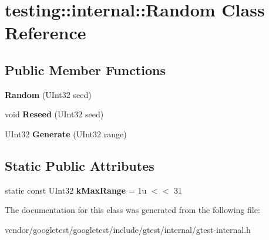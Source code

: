 \hypertarget{classtesting_1_1internal_1_1Random}{}\section{testing\+:\+:internal\+:\+:Random Class Reference}
\label{classtesting_1_1internal_1_1Random}
\subsection*{Public Member Functions}
\begin{DoxyCompactItemize}
\item 
{\bfseries Random} (U\+Int32 seed)\hypertarget{classtesting_1_1internal_1_1Random_a6e112be5e7cce00551f6383025f69460}{}\label{classtesting_1_1internal_1_1Random_a6e112be5e7cce00551f6383025f69460}

\item 
void {\bfseries Reseed} (U\+Int32 seed)\hypertarget{classtesting_1_1internal_1_1Random_adf2f24199318a46f885c78f50d89a69e}{}\label{classtesting_1_1internal_1_1Random_adf2f24199318a46f885c78f50d89a69e}

\item 
U\+Int32 {\bfseries Generate} (U\+Int32 range)\hypertarget{classtesting_1_1internal_1_1Random_a9315b7fb621cbcfdf92ed4b5e584c0db}{}\label{classtesting_1_1internal_1_1Random_a9315b7fb621cbcfdf92ed4b5e584c0db}

\end{DoxyCompactItemize}
\subsection*{Static Public Attributes}
\begin{DoxyCompactItemize}
\item 
static const U\+Int32 {\bfseries k\+Max\+Range} = 1u $<$$<$ 31\hypertarget{classtesting_1_1internal_1_1Random_a36d72dd7063d0b5338f229e75382fdd2}{}\label{classtesting_1_1internal_1_1Random_a36d72dd7063d0b5338f229e75382fdd2}

\end{DoxyCompactItemize}


The documentation for this class was generated from the following file\+:\begin{DoxyCompactItemize}
\item 
vendor/googletest/googletest/include/gtest/internal/gtest-\/internal.\+h\end{DoxyCompactItemize}
